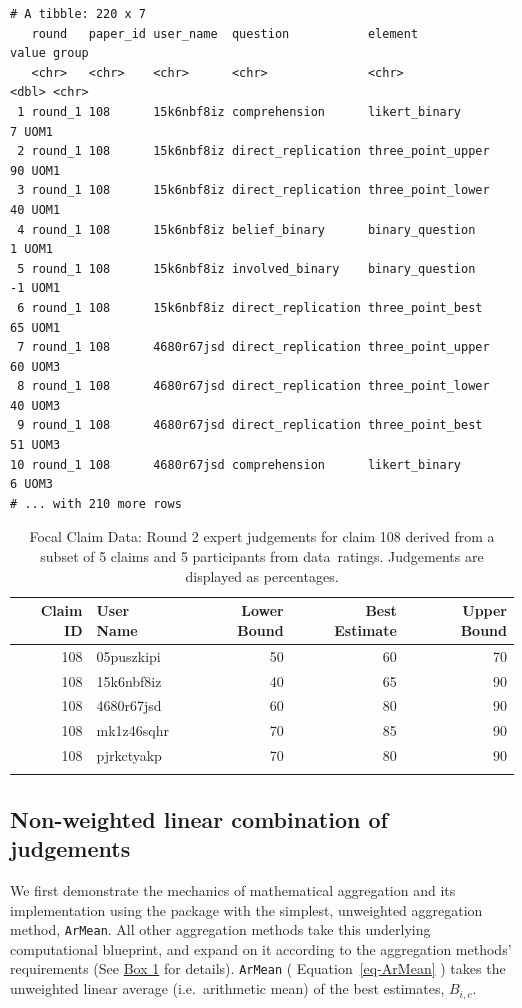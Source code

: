 \documentclass[article]{jss}
\begin{document}
\begin{verbatim}
# A tibble: 220 x 7
   round   paper_id user_name  question           element           value group
   <chr>   <chr>    <chr>      <chr>              <chr>             <dbl> <chr>
 1 round_1 108      15k6nbf8iz comprehension      likert_binary         7 UOM1 
 2 round_1 108      15k6nbf8iz direct_replication three_point_upper    90 UOM1 
 3 round_1 108      15k6nbf8iz direct_replication three_point_lower    40 UOM1 
 4 round_1 108      15k6nbf8iz belief_binary      binary_question       1 UOM1 
 5 round_1 108      15k6nbf8iz involved_binary    binary_question      -1 UOM1 
 6 round_1 108      15k6nbf8iz direct_replication three_point_best     65 UOM1 
 7 round_1 108      4680r67jsd direct_replication three_point_upper    60 UOM3 
 8 round_1 108      4680r67jsd direct_replication three_point_lower    40 UOM3 
 9 round_1 108      4680r67jsd direct_replication three_point_best     51 UOM3 
10 round_1 108      4680r67jsd comprehension      likert_binary         6 UOM3 
# ... with 210 more rows
\end{verbatim}

\hypertarget{tbl-focal-claim}{}
\begin{longtable}{rlrrr}

\toprule
Claim ID & User Name & Lower Bound & Best Estimate & Upper Bound \\ 
\midrule
108 & 05puszkipi & 50 & 60 & 70 \\ 
108 & 15k6nbf8iz & 40 & 65 & 90 \\ 
108 & 4680r67jsd & 60 & 80 & 90 \\ 
108 & mk1z46sqhr & 70 & 85 & 90 \\ 
108 & pjrkctyakp & 70 & 80 & 90 \\ 
\bottomrule
\caption{\label{tbl-focal-claim}Focal Claim Data: Round 2 expert judgements for claim 108 derived from a
subset of 5 claims and 5 participants from data~ratings. Judgements are
displayed as percentages. }\tabularnewline
\end{longtable}

\hypertarget{sec-AverageWAgg}{%
\subsection{Non-weighted linear combination of
judgements}\label{sec-AverageWAgg}}

We first demonstrate the mechanics of mathematical aggregation and its
implementation using the  package with the simplest,
unweighted aggregation method, \texttt{ArMean}. All other aggregation
methods take this underlying computational blueprint, and expand on it
according to the aggregation methods' requirements (See
\protect\hyperlink{aggWorkflow}{Box 1} for details). \texttt{ArMean} (
Equation~\ref{eq-ArMean} ) takes the unweighted linear average
(i.e.~arithmetic mean) of the best estimates, \(B_{i,c}\).
\end{document}
